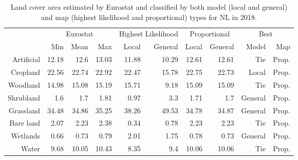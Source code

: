 \begin{table}[H]
\centering
\caption{Land cover area estimated by Eurostat and classified by both model (local and general) and map (highest likelihood and proportional) types for NL in 2018.}

\begin{tabular}{r|rrr|rr|rr|rr}
\toprule
{} & \multicolumn{3}{|c}{Eurostat} & \multicolumn{2}{|c}{Highest Likelihood} & \multicolumn{2}{|c}{Proportional} & \multicolumn{2}{|c}{Best} \\
{} &      Min &   Mean &    Max &              Local & General &        Local & General &    Model &    Map \\
\midrule
Artificial &    12.18 &   12.6 &  13.03 &              11.88 &   10.29 &        12.61 &   12.61 &      Tie &  Prop. \\
Cropland   &    22.56 &  22.74 &  22.92 &              22.47 &   15.78 &        22.75 &   22.73 &    Local &  Prop. \\
Woodland   &    14.98 &  15.08 &  15.19 &              15.71 &    9.18 &        15.09 &   15.09 &      Tie &  Prop. \\
Shrubland  &      1.6 &    1.7 &   1.81 &               0.97 &     3.3 &         1.71 &     1.7 &  General &  Prop. \\
Grassland  &    34.48 &  34.86 &  35.25 &              38.26 &   49.53 &        34.78 &   34.87 &  General &  Prop. \\
Bare land  &     2.07 &   2.23 &   2.38 &               0.34 &    0.78 &         2.23 &    2.23 &      Tie &  Prop. \\
Wetlands   &     0.66 &   0.73 &   0.79 &               2.01 &    1.75 &         0.78 &    0.73 &  General &  Prop. \\
Water      &     9.68 &  10.05 &  10.43 &               8.35 &     9.4 &        10.06 &   10.06 &      Tie &  Prop. \\
\bottomrule
\end{tabular}
\end{table}